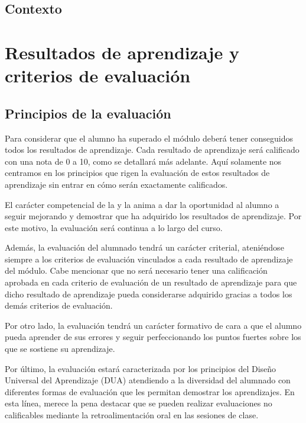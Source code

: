 \documentclass{didactica}
\newcommand{\lawref}[1]{\nameref{#1}}
\begin{document}
\section{Contexto}


\chapter{Resultados de aprendizaje y criterios de evaluación}




\section{Principios de la evaluación}
\label{sec:principios_de_la_evaluaci_n}

Para considerar que el alumno ha superado el módulo deberá tener conseguidos todos los resultados de aprendizaje. Cada resultado de aprendizaje será calificado con una nota de 0 a 10, como se detallará más adelante. 
%
Aquí solamente nos centramos en los principios que rigen la evaluación de estos resultados de aprendizaje sin entrar en cómo serán exactamente calificados.

El carácter competencial de la \lawref{ley:lomloe} y la \lawref{ley:nueva-fp} anima a dar la oportunidad al alumno a seguir mejorando y demostrar que ha adquirido los resultados de aprendizaje. 
%
Por este motivo, la evaluación será continua a lo largo del curso. 


Además, la evaluación del alumnado tendrá un carácter criterial, ateniéndose siempre a los criterios de evaluación vinculados a cada resultado de aprendizaje del módulo. 
%
Cabe mencionar que no será necesario tener una calificación aprobada en cada criterio de evaluación de un resultado de aprendizaje para que dicho resultado de aprendizaje pueda considerarse adquirido gracias a todos los demás criterios de evaluación. 

Por otro lado, la evaluación tendrá un carácter formativo de cara a que el alumno pueda aprender de sus errores y seguir perfeccionando los puntos fuertes sobre los que se sostiene su aprendizaje. 

Por último, la evaluación estará caracterizada por los principios del  Diseño Universal del Aprendizaje (DUA) atendiendo a la diversidad del alumnado con diferentes formas de evaluación que les permitan demostrar los aprendizajes. 
%
En esta línea, merece la pena destacar que se pueden realizar evaluaciones no calificables mediante la retroalimentación oral en las sesiones de clase.
\end{document}
